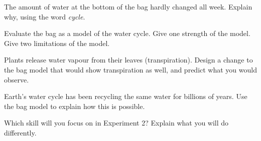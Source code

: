 \task The amount of water at the bottom of the bag hardly changed all week. Explain why, using the word \emph{cycle}.
\answerbox{5cm}

\task Evaluate the bag as a model of the water cycle. 
Give one strength of the model.
\answerbox{5cm}
Give two limitations of the model.
\answerbox{5cm}

\begin{yr8box}
\begin{keepext}
\exttask Plants release water vapour from their leaves (transpiration). Design a change to the bag model that would show transpiration as well, and predict what you would observe.
\answerbox{5cm}
\end{keepext}
\begin{keepext}
\exttask Earth's water cycle has been recycling the same water for billions of years. Use the bag model to explain how this is possible.
\answerbox{5cm}
\end{keepext}
\end{yr8box}


\begin{skillcheck}
\end{skillcheck}

\task Which skill will you focus on in Experiment 2? Explain what you will do differently.
\answerbox{5cm}
